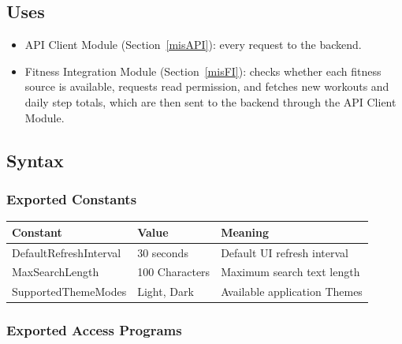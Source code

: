 \documentclass[12pt, titlepage]{article}
\begin{document}
\subsection{Uses}

\begin{itemize}
\item API Client Module (Section~\ref{misAPI}): every request to the
  backend.
\item Fitness Integration Module (Section~\ref{misFI}): checks whether each
  fitness source is available, requests read permission, and fetches new
  workouts and daily step totals, which are then sent to the backend through
  the API Client Module.
\end{itemize}

\subsection{Syntax}

\subsubsection{Exported Constants}

\begin{center}
\renewcommand{\arraystretch}{1.2}
\begin{tabular}{l l >{\raggedright\arraybackslash}p{7cm}}
\toprule
\textbf{Constant} & \textbf{Value} & \textbf{Meaning}\\
\midrule
\textsf{DefaultRefreshInterval} & 30 seconds & Default UI refresh interval\\
\textsf{MaxSearchLength} & 100 Characters & Maximum search text length\\
\textsf{SupportedThemeModes} & Light, Dark & Available application Themes\\
\bottomrule
\end{tabular}
\end{center}

\subsubsection{Exported Access Programs}
\end{document}
